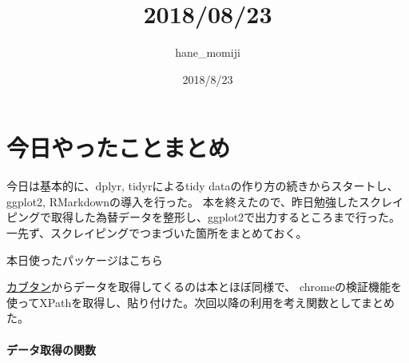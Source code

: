 \documentclass[]{article}
\title{2018/08/23}
\author{hane\_momiji}
\date{2018/8/23}
\let\oldparagraph\paragraph
\renewcommand{\paragraph}[1]{\oldparagraph{#1}\mbox{}}
\begin{document}
\maketitle

{
\setcounter{tocdepth}{2}
\tableofcontents
}
\section{今日やったことまとめ}

今日は基本的に、dplyr, tidyrによるtidy
dataの作り方の続きからスタートし、ggplot2, RMarkdownの導入を行った。
本を終えたので、昨日勉強したスクレイピングで取得した為替データを整形し、ggplot2で出力するところまで行った。
一先ず、スクレイピングでつまづいた箇所をまとめておく。

本日使ったパッケージはこちら

\href{https://kabutan.jp/stock/kabuka?code=0950}{カブタン}からデータを取得してくるのは本とほぼ同様で、
chromeの検証機能を使ってXPathを取得し、貼り付けた。次回以降の利用を考え関数としてまとめた。

\paragraph{データ取得の関数}
\end{document}
